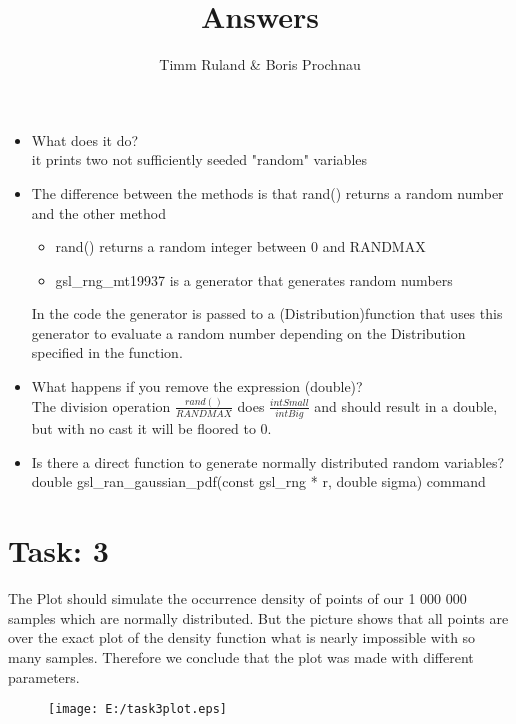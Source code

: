 \documentclass{article}
\title{Answers}
\author{Timm Ruland \& Boris Prochnau}
\begin{document}
\maketitle

\begin{itemize}
\section*{Task: 1}	%
	\item What does it do? \\
it prints two not sufficiently seeded "random" variables
	\item The difference between the methods is that rand() returns a random number 
and the other method
  
	\begin{itemize}
		\item rand() returns a random integer between 0 and RANDMAX
		\item gsl\_rng\_mt19937 is a generator that generates random numbers
	\end{itemize}
 In the code the generator is passed to a (Distribution)function that uses this generator 
 to evaluate a random number depending on the Distribution specified in the function.
	\item What happens if you remove the expression (double)?\\
 The division operation $\frac{rand()}{RANDMAX}$ does $\frac{int Small}{int Big}$ and
 should result in a double, but with no cast it will be floored to 0. 
	\item Is there a direct function to generate normally distributed random variables?\\
	double gsl\_ran\_gaussian\_pdf(const gsl\_rng * r, double sigma)
 command
\end{itemize}

\newpage
\section*{Task: 3} %
The Plot should simulate the occurrence density of points of our 1 000 000 samples which are normally distributed. But the picture
shows that all points are over the exact plot of the density function what is nearly impossible with so many samples. Therefore 
we conclude that the plot was made with different parameters.
\begin{figure}[h]
	\centering
		\texttt{[image: E:/task3plot.eps]}
	\label{fig:task3plot}
\end{figure}
\end{document}
